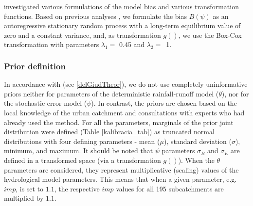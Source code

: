 \documentclass{ctuthesis}\usepackage[]{graphicx}\usepackage[]{color}
\begin{document}
\cite{giudice2013improving} investigated various formulations of the model bias and various transformation functions. Based on previous analyses \citep{pastorekEffectDifferentRainfall2016}, we formulate the bias $B (\psi)$ as an autoregressive stationary random process with a long-term equilibrium value of zero and a constant variance, and, as transformation $g()$, we use the Box-Cox transformation \citep{box1964analysis} with parameters $\lambda_1 =$ 0.45 and $\lambda_2 =$~1.




\subsubsection{Prior definition}

In accordance with \cite{giudice2013improving} (see \ref{delGiudTheor}), we do not use  completely uninformative priors neither for parameters of the deterministic rainfall-runoff model ($\theta$), nor for the stochastic error model ($\psi$). In contrast, the priors are chosen based on the local knowledge of the urban catchment and consultations with experts who had already used the method. For all the parameters, marginals of the prior joint distribution were defined (Table \ref{kalibracia_tab}) as truncated normal distributions with four defining parameters - mean ($\mu$), standard deviation ($\sigma$), minimum, and maximum. It should be noted that  $\psi$ parameters $\sigma_B$ and  $\sigma_E$ are defined in a transformed space (via a transformation $g()$).  When the $\theta$ parameters are considered, they represent multiplicative (scaling) values of the hydrological model parameters. This means that when a given parameter, e.g. $imp$, is set to $1.1$, the respective $imp$ values for all 195 subcatchments are multiplied by $1.1$.
\end{document}
